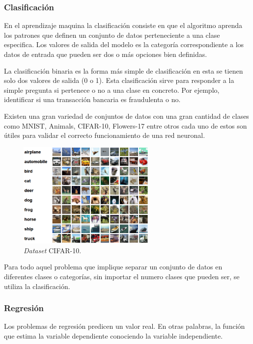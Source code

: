 \subsubsection{Clasificación}

En el aprendizaje maquina la clasificación consiste en que el algoritmo aprenda los patrones que definen un conjunto de datos perteneciente a una clase especifica. Los valores de salida del modelo es la categoría correspondiente a los datos de entrada que pueden ser dos o más opciones bien definidas.

La clasificación binaria es la forma más simple de clasificación en esta se tienen solo dos valores de salida (0 o 1). Esta clasificación sirve para responder a la simple pregunta si pertenece o no a una clase en concreto. Por ejemplo, identificar si una transacción bancaria es fraudulenta o no.

Existen una gran variedad de conjuntos de datos con una gran cantidad de clases como MNIST, Animals, CIFAR-10, Flowers-17 entre otros cada uno de estos son útiles para validar el correcto funcionamiento de una red neuronal.

\begin{figure}[H]
    \centering
    \includegraphics[width=0.6\textwidth]{MarcoTeorico/imgs/CIFAR-10.png}
    \caption{\textit{Dataset} CIFAR-10.}
    \label{fig:cifar10}
\end{figure}

Para todo aquel problema que implique separar un conjunto de datos en diferentes clases o categorías, sin importar el numero clases que pueden ser, se utiliza la clasificación.

\subsubsection{Regresión}

Los problemas de regresión predicen un valor real. En otras palabras, la función que estima la variable dependiente conociendo la variable independiente.


